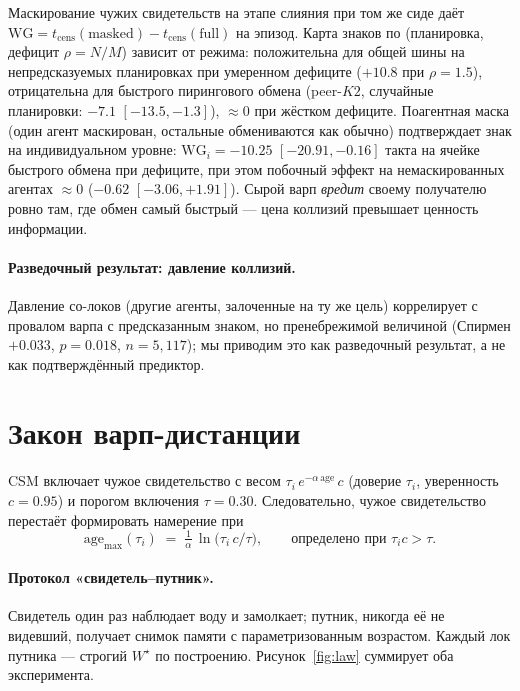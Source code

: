 \documentclass{article}
\newcommand{\wstar}{W^{\star}}
\begin{document}
Маскирование чужих свидетельств на этапе слияния при том же сиде даёт
$\mathrm{WG} = t_{\text{cens}}(\text{masked}) -
t_{\text{cens}}(\text{full})$ на эпизод. Карта знаков по (планировка,
дефицит $\rho{=}N/M$) зависит от режима: положительна для общей шины
на непредсказуемых планировках при умеренном дефиците ($+10.8$ при
$\rho{=}1.5$), отрицательна для быстрого пирингового обмена
(peer-$K2$, случайные планировки: $-7.1$ $[-13.5,-1.3]$),
${\approx}0$ при жёстком дефиците. Поагентная маска (один агент
маскирован, остальные обмениваются как обычно) подтверждает знак на
индивидуальном уровне: $\mathrm{WG}_i = -10.25$ $[-20.91,-0.16]$
такта на ячейке быстрого обмена при дефиците, при этом побочный
эффект на немаскированных агентах ${\approx}0$ ($-0.62$
$[-3.06,+1.91]$). Сырой варп \emph{вредит} своему получателю ровно
там, где обмен самый быстрый --- цена коллизий превышает ценность
информации. %

\paragraph{Разведочный результат: давление коллизий.} Давление
со-локов (другие агенты, залоченные на ту же цель) коррелирует с
провалом варпа с предсказанным знаком, но пренебрежимой величиной
(Спирмен $+0.033$, $p{=}0.018$, $n{=}5{,}117$); мы приводим это как
разведочный результат, а не как подтверждённый предиктор.

\section{Закон варп-дистанции}
\label{sec:law}

CSM включает чужое свидетельство с весом $\tau_i\, e^{-\alpha\,
\text{age}}\, c$ (доверие $\tau_i$, уверенность $c{=}0.95$) и порогом
включения $\tau{=}0.30$. Следовательно, чужое свидетельство перестаёт
формировать намерение при
\[
\mathrm{age}_{\max}(\tau_i) \;=\; \tfrac{1}{\alpha}\,
\ln\!\big(\tau_i\, c / \tau\big), \qquad \text{определено при } \tau_i c > \tau .
\]

\paragraph{Протокол «свидетель--путник».} Свидетель один раз
наблюдает воду и замолкает; путник, никогда её не видевший, получает
снимок памяти с параметризованным возрастом. Каждый лок путника ---
строгий $\wstar$ по построению. Рисунок~\ref{fig:law} суммирует оба
эксперимента.
\end{document}
